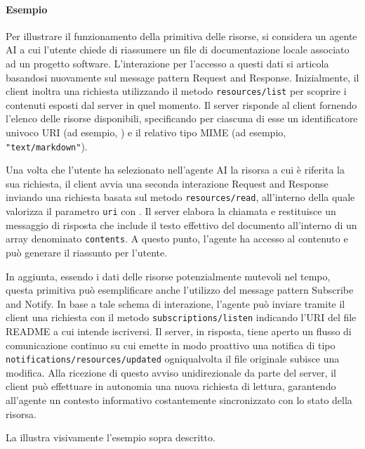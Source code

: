\paragraph{Esempio}\label{esempio-risorse}

Per illustrare il funzionamento della primitiva delle risorse, si
considera un agente AI a cui l'utente chiede di riassumere un file di
documentazione locale associato ad un progetto software. L'interazione
per l'accesso a questi dati si articola basandosi nuovamente sul message
pattern Request and Response. Inizialmente, il client inoltra una
richiesta utilizzando il metodo \texttt{resources/list} per scoprire i contenuti
esposti dal server in quel momento. Il server risponde al client
fornendo l'elenco delle risorse disponibili, specificando per ciascuna
di esse un identificatore univoco URI (ad esempio, ) e 
il relativo tipo MIME (ad esempio, \texttt{"text/markdown"}).

Una volta che l'utente ha selezionato nell'agente AI la risorsa a cui è
riferita la sua richiesta, il client avvia una seconda interazione
Request and Response inviando una richiesta basata sul metodo
\texttt{resources/read}, all'interno della quale valorizza il parametro \texttt{uri} con
. Il server elabora la chiamata e
restituisce un messaggio di risposta che include il testo effettivo del
documento all'interno di un array denominato \texttt{contents}. A questo punto,
l'agente ha accesso al contenuto e può generare il riassunto per
l'utente.

In aggiunta, essendo i dati delle risorse potenzialmente mutevoli nel
tempo, questa primitiva può esemplificare anche l'utilizzo del message
pattern Subscribe and Notify. In base a tale schema di interazione,
l'agente può inviare tramite il client una richiesta con il metodo
\texttt{subscriptions/listen} indicando l'URI del file README a cui intende
iscriversi. Il server, in risposta, tiene aperto un flusso di
comunicazione continuo su cui emette in modo proattivo una notifica di
tipo \texttt{notifications/resources/updated} ogniqualvolta il file originale
subisce una modifica. Alla ricezione di questo avviso unidirezionale da
parte del server, il client può effettuare in autonomia una nuova
richiesta di lettura, garantendo all'agente un contesto informativo
costantemente sincronizzato con lo stato della risorsa.

La  illustra visivamente l'esempio sopra descritto.

